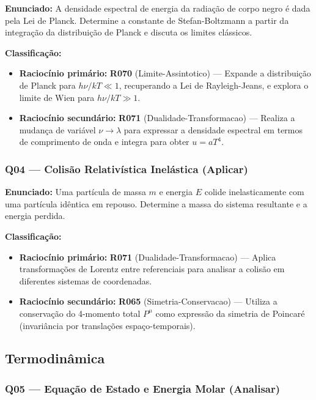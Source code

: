 \documentclass[12pt,a4paper]{article}
\newcommand{\rcode}[1]{\textcolor{azulprof}{\textbf{#1}}}
\newcommand{\bloom}[1]{\textcolor{verdeexame}{\textbf{#1}}}
\begin{document}
\textbf{Enunciado:} A densidade espectral de energia da radiação de corpo
negro é dada pela Lei de Planck. Determine a constante de Stefan-Boltzmann
a partir da integração da distribuição de Planck e discuta os limites
clássicos.

\medskip
\noindent\textbf{Classificação:}
\begin{itemize}
  \item \textbf{Raciocínio primário:} \rcode{R070} (Limite-Assintotico) ---
    Expande a distribuição de Planck para $h\nu/kT \ll 1$, recuperando a
    Lei de Rayleigh-Jeans, e explora o limite de Wien para $h\nu/kT \gg 1$.
  \item \textbf{Raciocínio secundário:} \rcode{R071} (Dualidade-Transformacao) ---
    Realiza a mudança de variável $\nu \to \lambda$ para expressar a
    densidade espectral em termos de comprimento de onda e integra para
    obter $u = aT^4$.
\end{itemize}

\subsubsection{Q04 --- Colisão Relativística Inelástica (\bloom{Aplicar})}

\textbf{Enunciado:} Uma partícula de massa $m$ e energia $E$ colide
inelasticamente com uma partícula idêntica em repouso. Determine a
massa do sistema resultante e a energia perdida.

\medskip
\noindent\textbf{Classificação:}
\begin{itemize}
  \item \textbf{Raciocínio primário:} \rcode{R071} (Dualidade-Transformacao) ---
    Aplica transformações de Lorentz entre referenciais para analisar a
    colisão em diferentes sistemas de coordenadas.
  \item \textbf{Raciocínio secundário:} \rcode{R065} (Simetria-Conservacao) ---
    Utiliza a conservação do 4-momento total $P^\mu$ como expressão da
    simetria de Poincaré (invariância por translações espaço-temporais).
\end{itemize}

\subsection{Termodinâmica}

\subsubsection{Q05 --- Equação de Estado e Energia Molar (\bloom{Analisar})}
\end{document}
